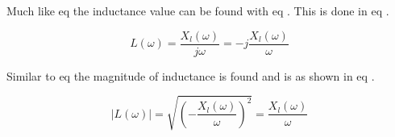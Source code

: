 Much like eq  the inductance value can be found with eq . This is done in eq .

\begin{equation}\label{eq:4_1_1_IndReactance2}
    L(\omega) = \frac{X_l(\omega)}{j\omega} = -j\frac{X_l(\omega)}{\omega}
\end{equation}

Similar to eq  the magnitude of inductance is found and is as shown in eq .

\begin{equation}\label{eq:4_1_1_IndReactance3}
    |L(\omega)| = \sqrt{\left(-\frac{X_l(\omega)}{\omega}\right)^2} = \frac{X_l(\omega)}{\omega}
\end{equation}